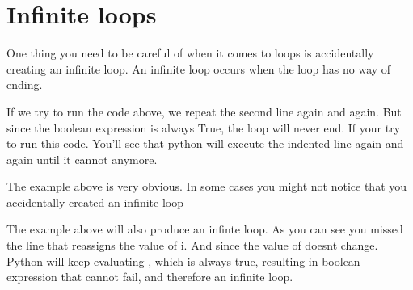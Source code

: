 \documentclass[letterpaper,10pt,english]{jupyterBook}
\begin{document}
\section{Infinite loops}
\label{\detokenize{loops:infinite-loops}}
\sphinxAtStartPar
One thing you need to be careful of when it comes to loops is accidentally creating an infinite loop. An infinite loop occurs when the loop has no way of ending.

\begin{sphinxVerbatim}[commandchars=\\\{\}]
 
\end{sphinxVerbatim}

\sphinxAtStartPar
If we try to run the code above, we repeat the second line again and again. But since the boolean expression is always True, the loop will never end. If your try to run this code. You’ll see that python will execute the indented line again and again until it cannot anymore.

\sphinxAtStartPar
The example above is very obvious. In some cases you might not notice that you accidentally created an infinite loop

\begin{sphinxVerbatim}[commandchars=\\\{\}]
   
   
\end{sphinxVerbatim}

\sphinxAtStartPar
The example above will also produce an infinte loop. As you can see you missed the line that reassigns the value of i. And since the value of  doesnt change. Python will keep evaluating , which is always true, resulting in boolean expression that cannot fail, and therefore an infinite loop.

\begin{sphinxVerbatim}[commandchars=\\\{\}]
   
   
        
\end{sphinxVerbatim}
\end{document}
